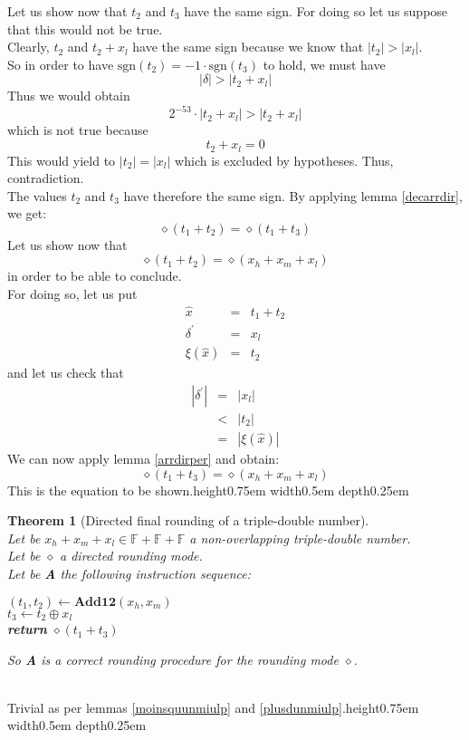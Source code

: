 \documentclass[a4paper,10pt,twoside]{article}
\newtheorem{theorem}{Theorem}[section]
\newenvironment{proof}[1][Proof]{\begin{trivlist}
\item[\hskip \labelsep {\bfseries #1}]}{\end{trivlist}}
\newcommand{\qed}{\nobreak \ifvmode \relax \else \ifdim \lastskip<1.5em \hskip-\lastskip
\hskip1.5em plus0em minus0.5em \fi \nobreak \vrule height0.75em width0.5em depth0.25em\fi}
\newcommand{\F}{\ensuremath{\mathbb {F}}}
\newcommand{\hi}{\ensuremath{\mathit{h}}}
\newcommand{\mi}{\ensuremath{\mathit{m}}}
\newcommand{\lo}{\ensuremath{\mathit{l}}}
\newcommand{\mAdd}{\ensuremath{\mathbf{Add12}}}
\newcommand{\sgn}{\ensuremath{\mathrm{sgn}}}
\begin{document}
\begin{proof}
Let us show now that $t_2$ and $t_3$ have the same sign. For doing so let us suppose that this would not be true.\\
Clearly, $t_2$ and $t_2 + x_\lo$ have the same sign because we know that 
$\left \vert t_2 \right \vert > \left \vert x_\lo \right \vert$. \\
So in order to have $\sgn\left( t_2 \right) = -1 \cdot \sgn\left( t_3 \right)$ to hold, we must have
$$\left \vert \delta \right \vert > \left \vert t_2 + x_\lo \right \vert$$
Thus we would obtain 
$$2^{-53} \cdot \left \vert t_2 + x_\lo \right \vert > \left \vert t_2 + x_\lo \right \vert$$
which is not true because 
$$t_2 + x_\lo = 0$$
This would yield to $\left \vert t_2 \right \vert = \left \vert x_\lo \right \vert$ which is excluded by hypotheses. 
Thus, contradiction. \\
The values $t_2$ and $t_3$ have therefore the same sign. By applying lemma \ref{decarrdir}, we get:
$$\diamond \left( t_1 + t_2 \right) = \diamond \left( t_1 + t_3 \right)$$
Let us show now that
$$\diamond \left( t_1 + t_2 \right) = \diamond \left( x_\hi + x_\mi + x_\lo \right)$$
in order to be able to conclude. \\
For doing so, let us put
\begin{eqnarray*}
\hat{x} & = & t_1 + t_2 \\
\delta^\prime & = & x_\lo \\
\xi\left( \hat{x} \right) & = & t_2 
\end{eqnarray*}
and let us check that
\begin{eqnarray*}
\left \vert \delta^\prime \right \vert 
& = & \left \vert x_\lo \right \vert \\
& < & \left \vert t_2 \right \vert \\
& = & \left \vert \xi\left(\hat{x}\right) \right \vert
\end{eqnarray*}
We can now apply lemma \ref{arrdirper} and obtain:
$$\diamond \left( t_1 + t_3 \right) = \diamond \left( x_\hi + x_\mi + x_\lo \right)$$
This is the equation to be shown.\qed
\end{proof}
\begin{theorem}[Directed final rounding of a triple-double number] \label{arrdir} ~ \\
Let be $x_\hi + x_\mi + x_\lo \in \F + \F + \F$ a non-overlapping triple-double number. \\
Let be $\diamond$ a directed rounding mode.\\
Let be {\bf A} the following instruction sequence:
\begin{center}
\begin{minipage}[b]{50mm}
$\left( t_1, t_2 \right) \gets \mAdd\left( x_\hi, x_\mi \right)$ \\
$t_3 \gets t_2 \oplus x_\lo$ \\
{\bf return } $\diamond\left( t_1 + t_3 \right)$
\end{minipage}
\end{center}
So {\bf A} is a correct rounding procedure for the rounding mode $\diamond$.
\end{theorem}
\begin{proof} ~\\
Trivial as per lemmas \ref{moinsquunmiulp} and \ref{plusdunmiulp}.\qed
\end{proof}
 

\end{document}
